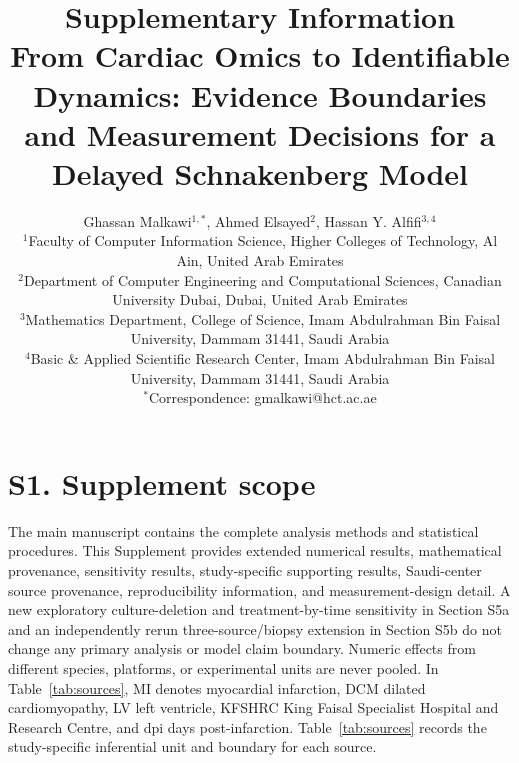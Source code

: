\documentclass[11pt]{article}
\title{\textbf{Supplementary Information}\\[4pt]\large From Cardiac Omics to Identifiable Dynamics: Evidence Boundaries and Measurement Decisions for a Delayed Schnakenberg Model}
\author{\parbox{0.94\textwidth}{\centering
Ghassan Malkawi$^{1,*}$, Ahmed Elsayed$^{2}$, Hassan Y. Alfifi$^{3,4}$\\[4pt]
\small $^{1}$Faculty of Computer Information Science, Higher Colleges of Technology, Al Ain, United Arab Emirates\\
\small $^{2}$Department of Computer Engineering and Computational Sciences, Canadian University Dubai, Dubai, United Arab Emirates\\
\small $^{3}$Mathematics Department, College of Science, Imam Abdulrahman Bin Faisal University, Dammam 31441, Saudi Arabia\\
\small $^{4}$Basic \& Applied Scientific Research Center, Imam Abdulrahman Bin Faisal University, Dammam 31441, Saudi Arabia\\
\small $^{*}$Correspondence: gmalkawi@hct.ac.ae
}}
\date{}
\begin{document}
\maketitle
\renewcommand{\thefigure}{S\arabic{figure}}
\renewcommand{\thetable}{S\arabic{table}}
\renewcommand{\theequation}{S\arabic{equation}}

\section*{S1. Supplement scope}
The main manuscript contains the complete analysis methods and statistical procedures. This Supplement provides extended numerical results, mathematical provenance, sensitivity results, study-specific supporting results, Saudi-center source provenance, reproducibility information, and measurement-design detail. A new exploratory culture-deletion and treatment-by-time sensitivity in Section S5a and an independently rerun three-source/biopsy extension in Section S5b do not change any primary analysis or model claim boundary. Numeric effects from different species, platforms, or experimental units are never pooled. In Table~\ref{tab:sources}, MI denotes myocardial infarction, DCM dilated cardiomyopathy, LV left ventricle, KFSHRC King Faisal Specialist Hospital and Research Centre, and dpi days post-infarction. Table~\ref{tab:sources} records the study-specific inferential unit and boundary for each source.
\end{document}
